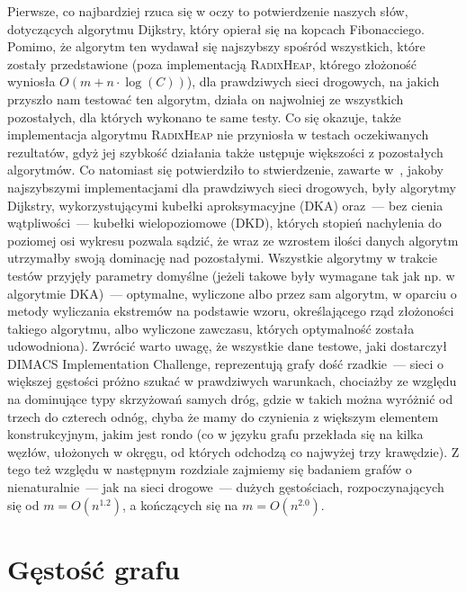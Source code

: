 Pierwsze, co najbardziej rzuca się w oczy to potwierdzenie naszych słów, dotyczących algorytmu Dijkstry, który opierał się na kopcach Fibonacciego. Pomimo, że algorytm ten wydawał się najszybszy spośród wszystkich, które zostały przedstawione (poza implementacją \textsc{RadixHeap}, którego złożoność wyniosła $ O \left( m + n \cdot \log \left( C\right) \right)$), dla prawdziwych sieci drogowych, na jakich przyszło nam testować ten algorytm, działa on najwolniej ze wszystkich pozostałych, dla których wykonano te same testy. Co się okazuje, także implementacja algorytmu \textsc{RadixHeap} nie przyniosła w testach oczekiwanych rezultatów, gdyż jej szybkość działania także ustępuje większości z pozostałych algorytmów. Co natomiast się potwierdziło to stwierdzenie, zawarte w~\cite{GIDA}, jakoby najszybszymi implementacjami dla prawdziwych sieci drogowych, były algorytmy Dijkstry, wykorzystującymi kubełki aproksymacyjne (\textsc{DKA}) oraz~--- bez cienia wątpliwości~--- kubełki wielopoziomowe (\textsc{DKD}), których stopień nachylenia do poziomej osi wykresu pozwala sądzić, że wraz ze wzrostem ilości danych algorytm utrzymałby swoją dominację nad pozostałymi. Wszystkie algorytmy w trakcie testów przyjęły parametry domyślne (jeżeli takowe były wymagane tak jak np. w algorytmie \textsc{DKA})~--- optymalne, wyliczone albo przez sam algorytm, w oparciu o metody wyliczania ekstremów na podstawie wzoru, określającego rząd złożoności takiego algorytmu, albo wyliczone zawczasu, których optymalność została udowodniona). Zwrócić warto uwagę, że wszystkie dane testowe, jaki dostarczył \textsf{DIMACS Implementation Challenge}, reprezentują grafy dość rzadkie~--- sieci o większej gęstości próżno szukać w prawdziwych warunkach, chociażby ze względu na dominujące typy skrzyżowań samych dróg, gdzie w takich można wyróżnić od trzech do czterech odnóg, chyba że mamy do czynienia z większym elementem konstrukcyjnym, jakim jest rondo (co w języku grafu przekłada się na kilka węzłów, ułożonych w okręgu, od których odchodzą co najwyżej trzy krawędzie). Z tego też względu w następnym rozdziale zajmiemy się badaniem grafów o nienaturalnie~--- jak na sieci drogowe~--- dużych gęstościach, rozpoczynających się od $m = O \left( n^{1.2} \right)$, a kończących się na $m = O \left( n^{2.0} \right)$.

\section{Gęstość grafu}

